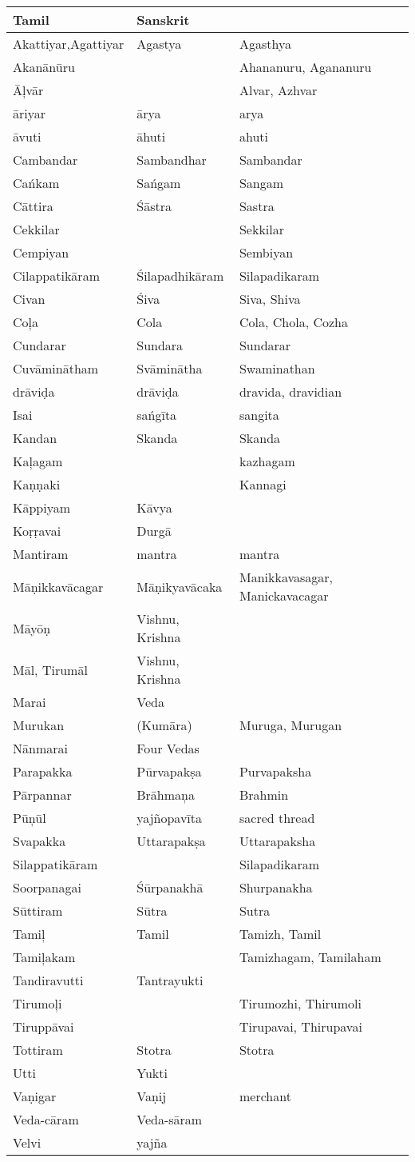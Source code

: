 \begin{longtable}{|m{2.5cm}|m{2.5cm}|>{\raggedright}m{3cm}|}
\hline
\multicolumn{1}{|m{2.5cm}|}{\centering Tamil} & \multicolumn{1}{m{2.5cm}|}{\centering Sanskrit} & \multicolumn{1}{m{3cm}|}{\centering English Equivalents Commonly Used} \\
\hline
Akattiyar,\break  Agattiyar & Agastya & Agasthya \tabularnewline
\hline
Akanānūru &  & Ahananuru, Agananuru \tabularnewline
\hline
Āļvār &  & Alvar, Azhvar \tabularnewline
\hline
āriyar & ārya & arya \tabularnewline
\hline
āvuti & āhuti & ahuti \tabularnewline
\hline
Cambandar & Sambandhar & Sambandar \tabularnewline
\hline
Cańkam & Sańgam & Sangam \tabularnewline
\hline
Cāttira & Śāstra & Sastra \tabularnewline
\hline
Cekkilar &  & Sekkilar \tabularnewline
\hline
Cempiyan &  & Sembiyan \tabularnewline
\hline
Cilappatikāram & Śilapadhikāram & Silapadikaram \tabularnewline
\hline
Civan & Śiva & Siva, Shiva \tabularnewline
\hline
Coļa & Cola & Cola, Chola, Cozha \tabularnewline
\hline
Cundarar & Sundara & Sundarar \tabularnewline
\hline
Cuvāminātham & Svāminātha & Swaminathan \tabularnewline
\hline
drāviḍa & drāviḍa & dravida, dravidian \tabularnewline
\hline
Isai & sańgīta & sangita \tabularnewline
\hline
Kandan & Skanda & Skanda \tabularnewline
\hline
Kaļagam &  & kazhagam \tabularnewline
\hline
Kaṇṇaki &  & Kannagi \tabularnewline
\hline
Kāppiyam & Kāvya &  \tabularnewline
\hline
Koṛṛavai & Durgā &  \tabularnewline
\hline
Mantiram & mantra & mantra \tabularnewline
\hline
Māṇikkavācagar & Māṇikyavācaka & Manikkavasagar, Manickavacagar \tabularnewline
\hline
Māyōṇ & Vishnu, Krishna &  \tabularnewline
\hline
Māl, Tirumāl & Vishnu, Krishna &  \tabularnewline
\hline
Marai & Veda &  \tabularnewline
\hline
Murukan & (Kumāra) & Muruga, Murugan \tabularnewline
\hline
Nānmarai & Four Vedas &  \tabularnewline
\hline
Parapakka & Pūrvapakṣa & Purvapaksha \tabularnewline
\hline
Pārpannar & Brāhmaņa & Brahmin \tabularnewline
\hline
Pūņūl & yajñopavīta & sacred thread \tabularnewline
\hline
Svapakka & Uttarapakṣa & Uttarapaksha \tabularnewline
\hline
Silappatikāram &  & Silapadikaram \tabularnewline
\hline
Soorpanagai & Śūrpanakhā & Shurpanakha \tabularnewline
\hline
Sūttiram & Sūtra & Sutra \tabularnewline
\hline
Tamiļ & Tamil & Tamizh, Tamil \tabularnewline
\hline
Tamiļakam &  & Tamizhagam, Tamilaham \tabularnewline
\hline
Tandiravutti & Tantrayukti &  \tabularnewline
\hline
Tirumoļi &  & Tirumozhi, Thirumoli \tabularnewline
\hline
Tiruppāvai &  & Tirupavai, Thirupavai \tabularnewline
\hline
Tottiram & Stotra & Stotra \tabularnewline
\hline
Utti & Yukti &  \tabularnewline
\hline
Vaṇigar & Vaṇij & merchant \tabularnewline
\hline
Veda-cāram & Veda-sāram &  \tabularnewline
\hline
Velvi & yajña &  \tabularnewline
\hline
\end{longtable}


